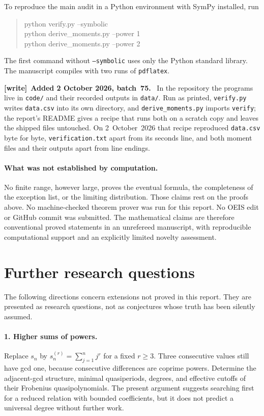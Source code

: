 \documentclass[11pt,a4paper]{article}
\numberwithin{equation}{section}
\theoremstyle{definition}
\newenvironment{writenote}[1][]{\par\smallskip\begingroup\small
 \noindent\textbf{[write]}\if\relax\detokenize{#1}\relax\else~\textbf{#1.}\fi\ }%
 {\par\endgroup\smallskip}
\begin{document}
To reproduce the main audit in a Python environment with SymPy installed,
run
\begin{quote}\ttfamily
python verify.py --symbolic\\
python derive\_moments.py --power 1\\
python derive\_moments.py --power 2
\end{quote}
The first command without \texttt{--symbolic} uses only the Python standard
library. The manuscript compiles with two runs of \texttt{pdflatex}.

\begin{writenote}[Added 2 October 2026, batch~75]
In the repository the programs live in \texttt{code/} and their recorded
outputs in \texttt{data/}. Run as printed, \texttt{verify.py} writes
\texttt{data.csv} into its own directory, and \texttt{derive\_moments.py}
imports \texttt{verify}; the report's README gives a recipe that runs both
on a scratch copy and leaves the shipped files untouched. On
2~October~2026 that recipe reproduced \texttt{data.csv} byte for byte,
\texttt{verification.txt} apart from its seconds line, and both moment
files and their outputs apart from line endings.
\end{writenote}

\paragraph{What was not established by computation.}
No finite range, however large, proves the eventual formula, the completeness
of the exception list, or the limiting distribution. Those claims rest on
the proofs above. No machine-checked theorem prover was run for this report.
No OEIS edit or GitHub commit was submitted. The mathematical claims are
therefore conventional proved statements in an unrefereed manuscript,
with reproducible computational support and an explicitly limited novelty
assessment.

\section{Further research questions}\label{pyf:sec:future}

The following directions concern extensions not proved in this report.
They are presented as research questions, not as conjectures whose truth
has been silently assumed.

\paragraph{1. Higher sums of powers.}
Replace $s_n$ by $s_n^{(r)}=\sum_{j=1}^n j^r$ for a fixed $r\geq3$.
Three consecutive values still have gcd one, because consecutive
differences are coprime powers. Determine the adjacent-gcd structure,
minimal quasiperiods, degrees, and effective cutoffs of their Frobenius
quasipolynomials. The present argument suggests searching first for a
reduced relation with bounded coefficients, but it does not predict a
universal degree without further work.
\end{document}
